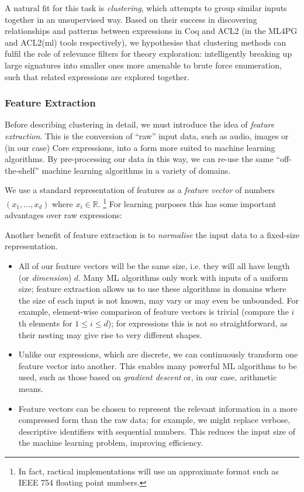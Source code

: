 A natural fit for this task is \emph{clustering}, which attempts to group similar inputs together in an unsupervised way. Based on their success in discovering relationships and patterns between expressions in Coq and ACL2 (in the ML4PG and ACL2(ml) tools respectively), we hypothesise that clustering methods can fulfil the role of relevance filters for theory exploration: intelligently breaking up large signatures into smaller ones more amenable to brute force enumeration, such that related expressions are explored together.

\subsubsection{Feature Extraction}
\label{sec:featureextraction}

Before describing clustering in detail, we must introduce the idea of \emph{feature extraction}. This is the conversion of ``raw'' input data, such as audio, images or (in our case) Core expressions, into a form more suited to machine learning algorithms. By pre-processing our data in this way, we can re-use the same ``off-the-shelf'' machine learning algorithms in a variety of domains.

We use a standard representation of features as a \emph{feature vector} of numbers $(x_1, \dots, x_d)$ where $x_i \in \mathbb{R}$. \footnote{In fact, ractical implementations will use an approximate format such as IEEE 754 floating point numbers.} For learning purposes this has some important advantages over raw expressions:

Another benefit of feature extraction is to \emph{normalise} the input data to a fixed-size representation.
\begin{itemize}
  \item All of our feature vectors will be the same size, i.e. they will all have length (or \emph{dimension}) $d$. Many ML algorithms only work with inputs of a uniform size; feature extraction allows us to use these algorithms in domains where the size of each input is not known, may vary or may even be unbounded. For example, element-wise comparison of feature vectors is trivial (compare the $i$th elements for $1 \leq i \leq d$); for expressions this is not so straightforward, as their nesting may give rise to very different shapes.
  \item Unlike our expressions, which are discrete, we can continuously transform one feature vector into another. This enables many powerful ML algorithms to be used, such as those based on \emph{gradient descent} or, in our case, arithmetic means.
  \item Feature vectors can be chosen to represent the relevant information in a more compressed form than the raw data; for example, we might replace verbose, descriptive identifiers with sequential numbers. This reduces the input size of the machine learning problem, improving efficiency.
\end{itemize}

